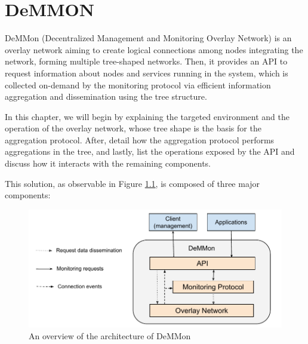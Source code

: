 

\chapter{DeMMON}
\label{cha:demmon}


DeMMon (Decentralized Management and Monitoring Overlay Network) is an overlay network aiming to create logical connections among nodes integrating the network, forming multiple tree-shaped networks. Then, it provides an API to request information about nodes and services running in the system, which is collected on-demand by the monitoring protocol via efficient information aggregation and dissemination using the tree structure.

In this chapter, we will begin by explaining the targeted environment and the operation of the overlay network, whose tree shape is the basis for the aggregation protocol. After, detail how the aggregation protocol performs aggregations in the tree, and lastly, list the operations exposed by the API and discuss how it interacts with the remaining components. 

This solution, as observable in Figure \ref{fig:demmon-overview}, is composed of three major components:

\begin{figure}[htbp]
    \centering
    \includegraphics[width=\textwidth]{Chapters/Figures/DeMMon-arch-overview.pdf}
    \caption{An overview of the architecture of DeMMon}
    \label{fig:demmon-overview}
\end{figure}


